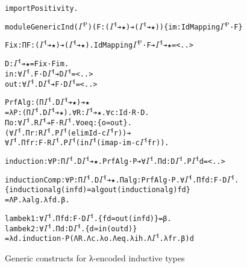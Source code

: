 \documentclass{article}
\newcommand{\splab}[1]{\ensuremath{^{\text{#1}}}}
\begin{document}
\begin{figure}
  \caption{Generic constructs for λ-encoded inductive types}
  \label{sfig:elab-mendler}
    {
\begin{alltt}
import Positivity.

module GenericInd (\(\Gamma\splab{P}\)) (F: (\(\Gamma\splab{I}\) ➔ ★) ➔ (\(\Gamma\splab{I}\) ➔ ★)) \{im: IdMapping \(\Gamma\splab{P}\) ·F\}

Fix: Π F: (\(\Gamma\splab{I}\) ➔ ★) ➔ (\(\Gamma\splab{I}\) ➔ ★). IdMapping \(\Gamma\splab{P}\) ·F ➔ \(\Gamma\splab{I}\) ➔ ★ = <..>

D: \(\Gamma\splab{I}\) ➔ ★ = Fix ·F im.
in: ∀ \(\Gamma\splab{I}\). F ·D \(\Gamma\splab{I}\) ➔ D \(\Gamma\splab{I}\) = <..>
out: ∀ \(\Gamma\splab{I}\). D \(\Gamma\splab{I}\) ➔ F ·D \(\Gamma\splab{I}\) = <..>

PrfAlg: (Π \(\Gamma\splab{I}\). D \(\Gamma\splab{I}\) ➔ ★) ➔ ★
= λ P: (Π \(\Gamma\splab{I}\). D \(\Gamma\splab{I}\) ➔ ★). ∀ R: \(\Gamma\splab{I}\) ➔ ★. ∀ c: Id ·R ·D.
  Π o: ∀ \(\Gamma\splab{I}\). R \(\Gamma\splab{I}\) ➔ F ·R \(\Gamma\splab{I}\). ∀ oeq: \{o ≃ out\}.
  (∀ \(\Gamma\splab{I}\). Π r: R \(\Gamma\splab{I}\). P \(\Gamma\splab{I}\) (elimId -c \(\Gamma\splab{I}\) r)) ➔
  ∀ \(\Gamma\splab{I}\). Π fr: F ·R \(\Gamma\splab{I}\). P \(\Gamma\splab{I}\) (in \(\Gamma\splab{I}\) (imap -im -c \(\Gamma\splab{I}\) fr)).

induction: ∀ P: Π \(\Gamma\splab{I}\). D \(\Gamma\splab{I}\) ➔ ★. PrfAlg ·P ➔ ∀ \(\Gamma\splab{I}\). Π d: D \(\Gamma\splab{I}\). P \(\Gamma\splab{I}\) d = <..>

inductionComp: ∀ P: Π \(\Gamma\splab{I}\). D \(\Gamma\splab{I}\) ➔ ★. Π alg: PrfAlg ·P. ∀ \(\Gamma\splab{I}\). Π fd: F ·D \(\Gamma\splab{I}\).
  \{induction alg (in fd) ≃ alg out (induction alg) fd\}
= Λ P. λ alg. λ fd. β.

lambek1: ∀ \(\Gamma\splab{I}\). Π fd: F ·D \(\Gamma\splab{I}\). \{fd ≃ out (in fd)\} = β.
lambek2: ∀ \(\Gamma\splab{I}\). Π d: D \(\Gamma\splab{I}\). \{d ≃ in (out d)\}
= λ d. induction ·P (Λ R. Λ c. λ o. Λ eq. λ ih. Λ \(\Gamma\splab{I}\). λ fr. β) d
\end{alltt}
}
\end{figure}
\end{document}
